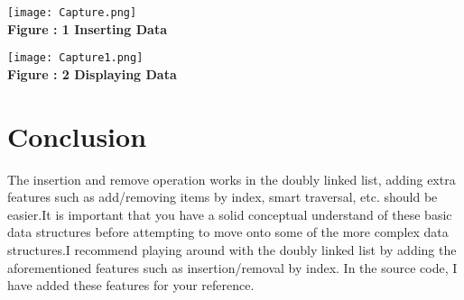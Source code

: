 \documentclass[11pt]{article}            %
\begin{document}
\begin{center}
 \texttt{[image: Capture.png]}\\ 
\textbf{Figure : 1 Inserting Data}
\vskip 0.5cm
\end{center}

\begin{center}
 \texttt{[image: Capture1.png]}\\ 
\textbf{Figure : 2 Displaying Data}
\vskip 0.5cm
\end{center}

\section{Conclusion}  
The insertion and remove operation works in the doubly linked list, adding extra features such as  add/removing items by index, smart traversal, etc. should be easier.It is important that you have a solid conceptual understand of these basic data structures before attempting to move onto some of the more complex data structures.I recommend playing around with the doubly linked list by adding the aforementioned features such as insertion/removal by index. In the source code, I have added these features for your reference.

 
\end{document}
